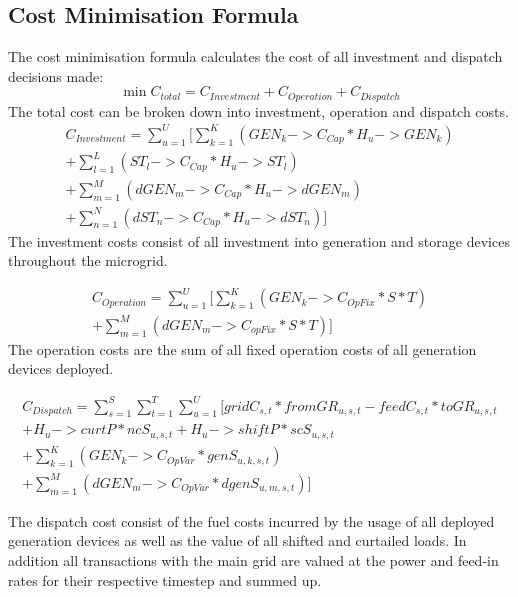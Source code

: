 \documentclass[
	11pt,								%
	DIV10,								%
	a4paper,         					%
	oneside,							%
	headheight=20pt,					%
	footheight=20pt,					%
    parskip=full,						%
    listof=totoc,						%
	bibliography=totoc,					%
	index=totoc,						%
]{scrartcl}
\begin{document}
\subsection{Cost Minimisation Formula}
The cost minimisation formula calculates the cost of all investment and dispatch decisions made:
\begin{equation}
	\min C_{total} = C_{Investment} + C_{Operation} + C_{Dispatch}
\end{equation}
The total cost can be broken down into investment, operation and dispatch costs.
\begin{equation}
	\begin{split}
		C_{Investment} = \sum_{u=1}^{U}[\sum_{k=1}^K{(GEN_k->C_{Cap} * H_u->GEN_k)}\\
		+ \sum_{l=1}^L{(ST_l->C_{Cap} * H_u->ST_l)}\\
		+ \sum_{m=1}^M{(dGEN_m->C_{Cap} * H_u->dGEN_m)}\\
		+ \sum_{n=1}^N{(dST_n->C_{Cap} * H_u->dST_n)}]
	\end{split}
\end{equation}
The investment costs consist of all investment into generation and storage devices throughout the microgrid.

\begin{equation}
	\begin{split}
		C_{Operation} = \sum_{u=1}^{U}[\sum_{k=1}^{K}(GEN_k->C_{OpFix} * S * T)\\
	 	+ \sum_{m=1}^{M}(dGEN_m->C_{opFix} * S * T)]
	\end{split}
\end{equation}
The operation costs are the sum of all fixed operation costs of all generation devices deployed.

\begin{equation}
	\begin{split}
		C_{Dispatch} = \sum_{s=1}^{S}\sum_{t=1}^{T}\sum_{u=1}^{U}[gridC_{s,t} * fromGR_{u,s,t} - feedC_{s,t} * toGR_{u,s,t}\\
		+ H_u->curtP * ncS_{u,s,t} + H_u->shiftP * scS_{u,s,t}\\
		+ \sum_{k=1}^K(GEN_k->C_{OpVar} * genS_{u,k,s,t})\\ 
		+ \sum_{m=1}^M(dGEN_m->C_{OpVar} * dgenS_{u,m,s,t})]
	\end{split}
\end{equation}

The dispatch cost consist of the fuel costs incurred by the usage of all deployed generation devices as well as the value of all shifted and curtailed loads. In addition all transactions with the main grid are valued at the power and feed-in rates for their respective timestep and summed up.
\end{document}
